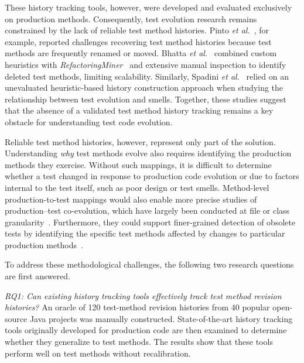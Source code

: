 These history tracking tools, however, were developed and evaluated exclusively on production methods. Consequently, test evolution research remains constrained by the lack of reliable test method histories. Pinto \textit{et al.}~\cite{pinto2012understanding}, for example, reported challenges recovering test method histories because test methods are frequently renamed or moved. Bhatta \textit{et al.}~\cite{bhatta2025understanding} combined custom heuristics with \emph{RefactoringMiner}~\cite{tsantalis2020refactoringminer} and extensive manual inspection to identify deleted test methods, limiting scalability. Similarly, Spadini \textit{et al.}~\cite{Spadini:2018} relied on an unevaluated heuristic-based history construction approach when studying the relationship between test evolution and smells. Together, these studies suggest that the absence of a validated test method history tracking remains a key obstacle for understanding test code evolution.

Reliable test method histories, however, represent only part of the solution. Understanding \emph{why} test methods evolve also requires identifying the production methods they exercise. Without such mappings, it is difficult to determine whether a test changed in response to production code evolution or due to factors internal to the test itself, such as poor design or test smells. Method-level production-to-test mappings would also enable more precise studies of production--test co-evolution, which have largely been conducted at file or class granularity~\cite{zaidman2011studying,sun_revisiting_2023,wang2021understanding}. Furthermore, they could support finer-grained detection of obsolete tests by identifying the specific test methods affected by changes to particular production methods~\cite{bhatta2025understanding,yaraghi2025automated,pinto2012understanding,hao2013bug}.

To address these methodological challenges, the following two research questions are first answered.


\emph{RQ1: Can existing history tracking tools effectively track test method revision histories?} An oracle of 120 test-method revision histories from 40 popular open-source Java projects was manually constructed. State-of-the-art history tracking tools originally developed for production code are then examined to determine whether they generalize to test methods. The results show that these tools perform well on test methods without recalibration.

